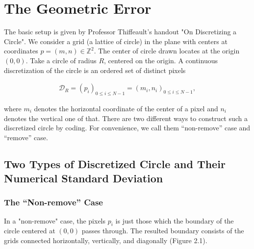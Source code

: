 \documentclass[letterpaper]{article}
\numberwithin{equation}{section} %
\numberwithin{figure}{section} %
\numberwithin{table}{section} %
\begin{document}
\section{The Geometric Error}

The basic setup is given by Professor Thiffeault's handout "On Discretizing a Circle". We consider a grid (a lattice of circle) in the plane with centers at coordinates $p=(m, n)\in\mathbb{Z}^2$. The center of circle drawn locates at the origin $(0,0)$. Take a circle of radius $R$, centered on the origin. A continuous discretization of the circle is an ordered set of distinct pixels 

\begin{align} 
\mathcal{D}_R=(p_{i})_{0 \leq i \leq N-1} = (m_i, n_i)_{0 \leq i \leq N-1},
\end{align}

\noindent
where $m_i$ denotes the horizontal coordinate of the center of a pixel and $n_i$ denotes the vertical one of that. There are two different ways to construct such a discretized circle by coding. For convenience, we call them \enquote{non-remove} case and \enquote{remove} case.


\subsection{Two Types of Discretized Circle and Their Numerical Standard Deviation}

\subsubsection{The \enquote{Non-remove} Case}


In a "non-remove" case, the pixels $p_i$ is just those which the boundary of the circle centered at $(0,0)$ passes through. The resulted boundary consists of the grids connected horizontally, vertically, and diagonally (Figure 2.1). 
\end{document}
